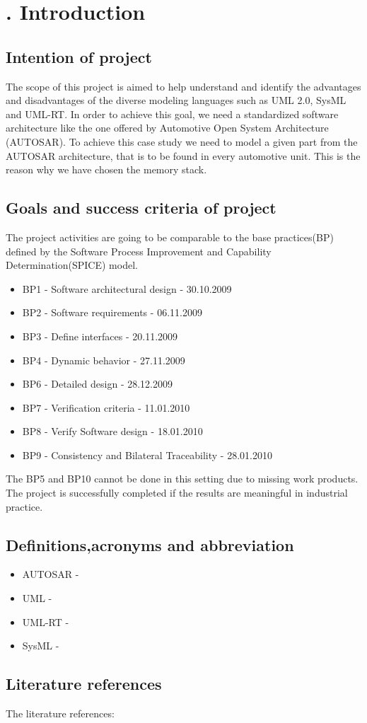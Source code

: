 \chapter[Introduction]{\thechapter. Introduction}
\section{Intention of project}
The scope of this project is aimed to help understand and identify the advantages and disadvantages of the diverse modeling languages such as UML 2.0, SysML and UML-RT. In order to achieve this goal, we need a standardized software architecture like the one offered by Automotive Open System Architecture (AUTOSAR).\newline
To achieve this case study we need to model a given part from the AUTOSAR architecture, that is to be found in every automotive unit. This is the reason why we have chosen the memory stack.
\section{Goals and success criteria of project}
The project activities are going to be comparable to the base practices(BP) defined by the Software Process Improvement and Capability Determination(SPICE) model.
\begin{itemize}
\item BP1 - Software architectural design - 30.10.2009
\item BP2 - Software requirements - 06.11.2009
\item BP3 - Define interfaces - 20.11.2009
\item BP4 - Dynamic behavior - 27.11.2009
\item BP6 - Detailed design - 28.12.2009
\item BP7 - Verification criteria - 11.01.2010
\item BP8 - Verify Software design - 18.01.2010
\item BP9 - Consistency and Bilateral Traceability - 28.01.2010
\end{itemize}
The BP5 and BP10 cannot be done in this setting due to missing work products. The project is successfully completed if the results are meaningful in industrial practice.

\section{Definitions,acronyms and abbreviation}
\begin{itemize}
\item AUTOSAR -
\item UML -
\item UML-RT -
\item SysML -
\end{itemize}

\section{Literature references}
The literature references:
